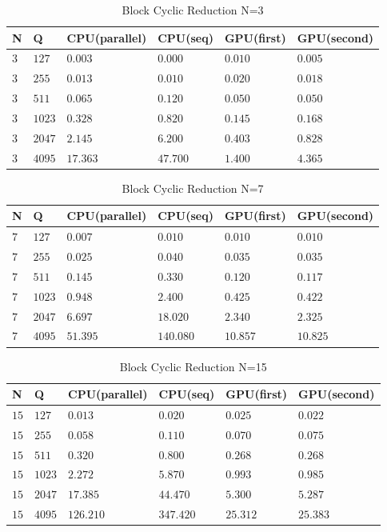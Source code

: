 \newpage
    \begin{table}[H]
\caption{Block Cyclic Reduction N=3} 
\centering 
\begin{tabular}{| l |  p{1cm} |p{}| p{} |  p{}| p{} | } 
\hline\hline 
N & Q & CPU(parallel) & CPU(seq) & GPU(first)  & GPU(second)\\ [0.8ex] 
\hline
$3$ &	$127$ & $0.003$	&	$0.000$ & $0.010$ &  $0.005$ \\
$3$ &	$255$ & $0.013$	&	$0.010$ & $0.020$ & $0.018$ \\
$3$ &	$511$ & $0.065$	& $0.120$ & $0.050$ & $0.050$ \\
$3$ &	$1023$ & $0.328$	&	$0.820$ & $0.145$ & $0.168$ \\
$3$ &	$2047$ & $2.145$	&	$6.200$ & $0.403$ & $0.828$ \\
$3$ &	$4095$ & $17.363$	&	$47.700$ & $1.400$ & $4.365$ \\[1ex]
\hline 
\end{tabular}
\label{table:bcr_n=3} 
\end{table}

\begin{table}[H]
\caption{Block Cyclic Reduction N=7} 
\centering 
\begin{tabular}{| l |  p{1cm} |p{}| p{} |  p{}| p{} | } 
\hline\hline 
N & Q & CPU(parallel) & CPU(seq) & GPU(first)  & GPU(second) \\ [0.8ex] 
\hline
$7$ &	$127$ & $0.007$	&	$0.010$ & $0.010$ & $0.010$ \\
$7$ &	$255$ & $0.025$	&	$0.040$ & $0.035$ & $0.035$ \\
$7$ &	$511$ & $0.145$	&	$0.330$ & $0.120$ & $0.117$\\
$7$ &	$1023$ & $0.948$	&	$2.400$ & $0.425$ & $0.422$ \\
$7$ &	$2047$ & $6.697$	&	$18.020$ & $2.340$ & $2.325$ \\
$7$ &	$4095$ & $51.395$	&	$140.080$ & $10.857$ & $10.825$ \\[1ex]
\hline 
\end{tabular}
\label{table:bcr_n=7} 
\end{table}

   \begin{table}[H]
\caption{Block Cyclic Reduction N=15} 
\centering 
\begin{tabular}{| l |  p{1cm} |p{}| p{} |  p{}| p{}  |} 
\hline\hline 
N & Q & CPU(parallel) & CPU(seq) & GPU(first)  & GPU(second) \\ [0.8ex] 
\hline
$15$ &	$127$ & $0.013$	&	$0.020$ & $0.025$ & $0.022$ \\
$15$ &	$255$ & $0.058$	&	$0.110$ & $0.070$ & $0.075$ \\
$15$ &	$511$ & $0.320$	&	$0.800$ & $0.268$ & $0.268$ \\
$15$ &	$1023$ & $2.272$	& $5.870$  & $0.993$ & $0.985$ \\
$15$ &	$2047$ & $17.385$	&	$44.470$ & $5.300$ & $5.287$ \\
$15$ &  $4095$ & $126.210$	&	$347.420$ & $25.312$ &  $25.383$\\[1ex]
\hline 
\end{tabular}
\label{table:bcr_n=15} 
\end{table}

